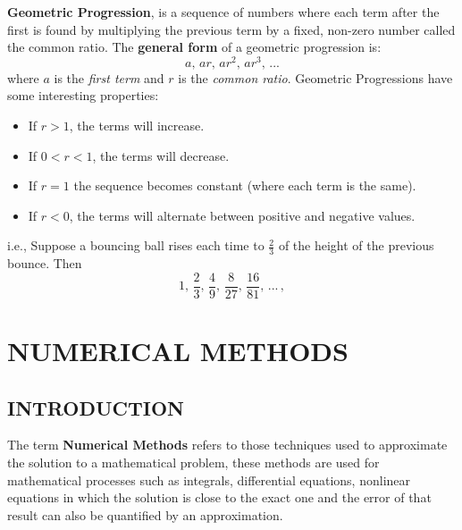 \documentclass[12pt]{report}
\begin{document}
\par \textbf{Geometric Progression}, is a sequence of numbers where each term after the first is found by multiplying the previous term by a fixed, non-zero number called the common ratio. The \textbf{general form} of a geometric progression is:
\begin{equation}\label{eq:GP_general-form-1}
a, \, ar, \, ar^{2}, \, ar^{3}, \, ...
\end{equation}
where $a$ is the \textit{first term} and $r$ is the \textit{common ratio}. Geometric Progressions have some interesting properties:
\begin{itemize}
\item If $r > 1$, the terms will increase.
\item If $0 < r < 1$, the terms will decrease.
\item If $r = 1$ the sequence becomes constant (where each term is the same).
\item If $r < 0$, the terms will alternate between positive and negative values.
\end{itemize} 
i.e., Suppose a bouncing ball rises each time to $\frac{2}{3}$ of the height of the previous bounce. Then	
\begin{equation}\label{BounceBall-ie1}
1, \, \frac{2}{3}, \, \frac{4}{9}, \, \frac{8}{27}, \, \frac{16}{81}, \, ... \, ,
\end{equation}


\part{NUMERICAL METHODS}

\chapter{INTRODUCTION}

\par The term \textbf{Numerical Methods} refers to those techniques used to approximate the solution to a mathematical problem, these methods are used for mathematical processes such as integrals, differential equations, nonlinear equations in which the solution is close to the exact one and the error of that result can also be quantified by an approximation.
\end{document}
